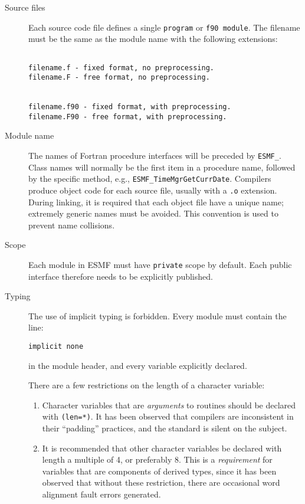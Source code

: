 \begin{description}
\item[Source files] Each source code file defines a single
  \texttt{program} or \texttt{f90 module}. The filename must be the
  same as the module name with the following extensions:
\begin{verbatim}

filename.f - fixed format, no preprocessing.
filename.F - free format, no preprocessing.


filename.f90 - fixed format, with preprocessing.
filename.F90 - free format, with preprocessing.

\end{verbatim}
\item[Module name] The names of Fortran procedure interfaces will be
  preceded by {\tt ESMF\_}.  Class names will normally be the first
  item in a procedure name, followed by the specific method, e.g.,
  {\tt ESMF\_TimeMgrGetCurrDate}. Compilers produce object code for
  each source file, usually with a \texttt{.o} extension. During
  linking, it is required that each object file have a unique name;
  extremely generic names must be avoided. This convention is used to
  prevent name collisions.

\item[Scope] Each module in ESMF must have \texttt{private} scope by
  default.  Each public interface therefore needs to be explicitly
  published.
  
\item[Typing] The use of implicit typing is forbidden. Every module
  must contain the line:

\begin{verbatim}
implicit none
\end{verbatim}

in the module header, and every variable explicitly declared.

There are a few restrictions on the length of a character variable:

\begin{enumerate}
\item Character variables that are \emph{arguments} to routines should
  be declared with \texttt{(len=*)}. It has been observed that
  compilers are inconsistent in their ``padding'' practices, and the
  standard is silent on the subject.
\item It is recommended that other character variables be declared
  with length a multiple of 4, or preferably 8. This is a
  \emph{requirement} for variables that are components of derived
  types, since it has been observed that without these restriction,
  there are occasional word alignment fault errors generated.
\end{enumerate}


\end{description}
